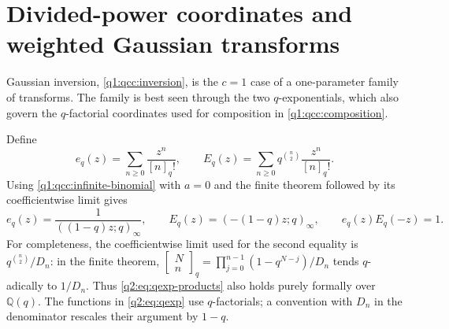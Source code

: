 \documentclass[11pt,a4paper,oneside,openany]{book}
\theoremstyle{definition}
\theoremstyle{remark}
\newcommand{\Q}{\mathbb Q}
\newcommand{\GB}[3][q]{\begin{bmatrix}#2\\#3\end{bmatrix}_{#1}}
\newcommand{\qf}[2][q]{[#2]_{#1}!}
\newcommand{\qb}[2]{\GB{#1}{#2}}
\newcommand{\poch}[3]{(#1;#2)_{#3}}
\begin{document}
\section{Divided-power coordinates and weighted Gaussian transforms}
\label{q2:sec:transforms}
Gaussian inversion, \cref{q1:qcc:inversion}, is the \(c=1\) case of a
one-parameter family of transforms. The family is best seen through the two
\(q\)-exponentials, which also govern the \(q\)-factorial coordinates used
for composition in \cref{q1:qcc:composition}.


Define
\begin{equation}\label{q2:eq:qexp}
 e_q(z)=\sum_{n\ge0}\frac{z^n}{\qf n},\qquad
 E_q(z)=\sum_{n\ge0}q^{\binom n2}\frac{z^n}{\qf n}.
\end{equation}
Using \cref{q1:qcc:infinite-binomial} with $a=0$ and the finite theorem followed by its
coefficientwise limit gives
\begin{equation}\label{q2:eq:qexp-products}
 e_q(z)=\frac1{\poch{(1-q)z}q\infty},\qquad
 E_q(z)=\poch{-(1-q)z}q\infty,
 \qquad e_q(z)E_q(-z)=1.
\end{equation}
For completeness, the coefficientwise limit used for the second equality is
$q^{\binom n2}/D_n$: in the finite theorem,
$\qb Nn=\prod_{j=0}^{n-1}(1-q^{N-j})/D_n$ tends $q$-adically to $1/D_n$.
Thus \eqref{q2:eq:qexp-products} also holds purely formally over $\Q(q)$.
The functions in \eqref{q2:eq:qexp} use $q$-factorials; a convention with $D_n$ in
the denominator rescales their argument by $1-q$.
\end{document}
